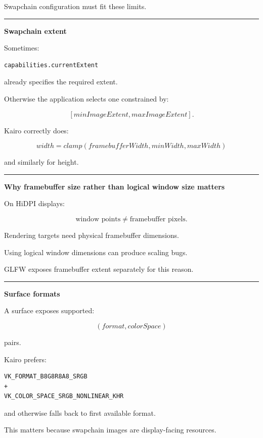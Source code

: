 Swapchain configuration must fit these limits.

\begin{center}\rule{0.5\linewidth}{0.5pt}\end{center}

\textbf{Swapchain extent}

Sometimes:

\begin{verbatim}
capabilities.currentExtent
\end{verbatim}

already specifies the required extent.

Otherwise the application selects one constrained by:

\[
[minImageExtent,maxImageExtent].
\]

Kairo correctly does:

\[
width=
clamp(
framebufferWidth,
minWidth,
maxWidth
)
\]

and similarly for height.

\begin{center}\rule{0.5\linewidth}{0.5pt}\end{center}

\textbf{Why framebuffer size rather than logical window size matters}

On HiDPI displays:

\[
\text{window points}
\neq
\text{framebuffer pixels}.
\]

Rendering targets need physical framebuffer dimensions.

Using logical window dimensions can produce scaling bugs.

GLFW exposes framebuffer extent separately for this reason.

\begin{center}\rule{0.5\linewidth}{0.5pt}\end{center}

\textbf{Surface formats}

A surface exposes supported:

\[
(format,colorSpace)
\]

pairs.

Kairo prefers:

\begin{verbatim}
VK_FORMAT_B8G8R8A8_SRGB
+
VK_COLOR_SPACE_SRGB_NONLINEAR_KHR
\end{verbatim}

and otherwise falls back to first available format.

This matters because swapchain images are display-facing resources.

